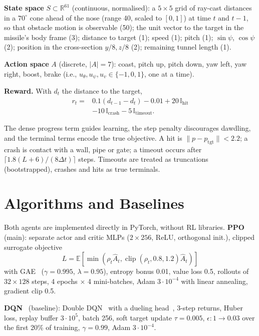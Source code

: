 \documentclass[10pt,a4paper,twocolumn]{article}
\begin{document}
\textbf{State space} $S\subset\mathbb{R}^{61}$ (continuous,
normalised): a $5\times5$ grid of ray-cast distances in a
$70^\circ$ cone ahead of the nose (range 40, scaled to $[0,1]$)
at time $t$ and $t-1$, so that obstacle motion is observable (50);
the unit vector to the target in the missile's body frame (3);
distance to target (1); speed (1); pitch (1); $\sin\psi$,
$\cos\psi$ (2); position in the cross-section $y/8,z/8$ (2);
remaining tunnel length (1).

\textbf{Action space} $A$ (discrete, $|A|=7$): coast, pitch up,
pitch down, yaw left, yaw right, boost, brake
(i.e., $u_\theta,u_\psi,u_v\in\{-1,0,1\}$, one at a time).

\textbf{Reward.} With $d_t$ the distance to the target,
\begin{equation}
\begin{split}
 r_t={}&0.1(d_{t-1}-d_t)-0.01+20\,\mathbb{I}_{\mathrm{hit}}\\
      &-10\,\mathbb{I}_{\mathrm{crash}}-5\,\mathbb{I}_{\mathrm{timeout}}.
\end{split}
\end{equation}

The dense progress term guides learning, the step penalty
discourages dawdling, and the terminal terms encode the true
objective. A hit is $\|p-p_{\mathrm{tgt}}\|<2.2$; a crash is
contact with a wall, pipe or gate; a timeout occurs after
$\lceil1.8(L+6)/(8\Delta t)\rceil$ steps. Timeouts are treated
as truncations (bootstrapped), crashes and hits as true terminals.

\section{Algorithms and Baselines}

Both agents are implemented directly in PyTorch, without RL
libraries. \textbf{PPO}~\cite{schulman2017} (main): separate actor
and critic MLPs ($2\times256$, ReLU, orthogonal init.), clipped
surrogate objective
\begin{equation}
L=\mathbb{E}\!\left[
\min\left(\rho_t\hat A_t,
\operatorname{clip}(\rho_t,0.8,1.2)\hat A_t\right)\right]
\end{equation}
with GAE~\cite{schulman2016} ($\gamma=0.995$,
$\lambda=0.95$), entropy bonus 0.01, value loss 0.5,
rollouts of $32\times128$ steps, 4 epochs $\times$ 4 mini-batches,
Adam $3\cdot10^{-4}$ with linear annealing, gradient clip 0.5.

\textbf{DQN}~\cite{mnih2015} (baseline): Double DQN~\cite{hasselt2016}
with a dueling head~\cite{wang2016}, 3-step returns, Huber loss,
replay buffer $3\cdot10^5$, batch 256, soft target update
$\tau=0.005$, $\epsilon:1\to0.03$ over the first 20\% of training,
$\gamma=0.99$, Adam $3\cdot10^{-4}$.
\end{document}
